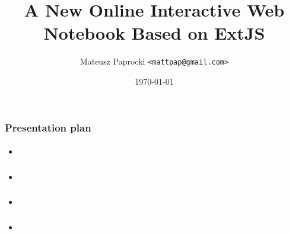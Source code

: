 \documentclass{beamer}
\title{A New Online Interactive Web Notebook Based on ExtJS}
\author{Mateusz Paprocki \texttt{<mattpap@gmail.com>}}
\institute[PWR]{Wrocław University of Technology}
\date{\today}
\begin{document}
\frame{\titlepage}

\begin{frame}
    \frametitle{Presentation plan}
    \framesubtitle{}

    \begin{itemize}
        \item
    \end{itemize}
\end{frame}

\begin{frame}
    \frametitle{}
    \framesubtitle{}

    \begin{itemize}
        \item
    \end{itemize}
\end{frame}

\begin{frame}
    \frametitle{}
    \framesubtitle{}

    \begin{itemize}
        \item
    \end{itemize}
\end{frame}

\begin{frame}
    \frametitle{}
    \framesubtitle{}

    \begin{itemize}
        \item
    \end{itemize}
\end{frame}
\end{document}
